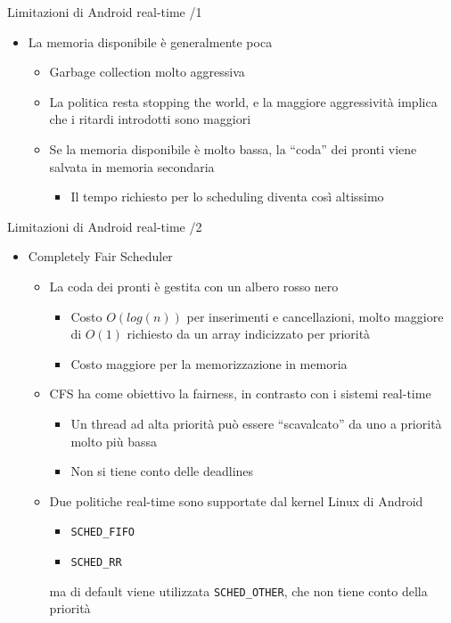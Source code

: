 \begin{frame}{Limitazioni di Android real-time /1}
	\begin{itemize}
		\item La memoria disponibile è generalmente poca
		\begin{itemize}
			\item Garbage collection molto aggressiva
			\item La politica resta stopping the world, e la maggiore aggressività implica che i ritardi introdotti sono maggiori
			\item Se la memoria disponibile è molto bassa, la ``coda'' dei pronti viene salvata in memoria secondaria
			\begin{itemize}
				\item Il tempo richiesto per lo scheduling diventa così altissimo
			\end{itemize}
		\end{itemize}
	\end{itemize}
\end{frame}
\begin{frame}{Limitazioni di Android real-time /2}
	\begin{itemize}
		\item Completely Fair Scheduler
		\begin{itemize}
			\item La coda dei pronti è gestita con un albero rosso nero
			\begin{itemize}
				\item Costo $O(log(n))$ per inserimenti e cancellazioni, molto maggiore di $O(1)$ richiesto da un array indicizzato per priorità
				\item Costo maggiore per la memorizzazione in memoria
			\end{itemize}
			\item CFS ha come obiettivo la fairness, in contrasto con i sistemi real-time
			\begin{itemize}
				\item Un thread ad alta priorità può essere ``scavalcato'' da uno a priorità molto più bassa
				\item Non si tiene conto delle deadlines
			\end{itemize}
			\item Due politiche real-time sono supportate dal kernel Linux di Android
			\begin{itemize}
				\item \texttt{SCHED\_FIFO}
				\item \texttt{SCHED\_RR}
			\end{itemize}
			ma di default viene utilizzata \texttt{SCHED\_OTHER}, che non tiene conto della priorità
		\end{itemize}
	\end{itemize}
\end{frame}
